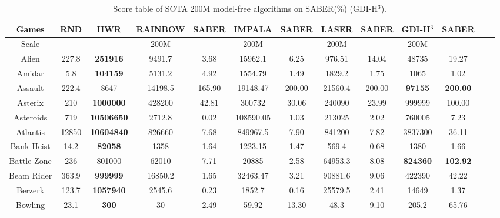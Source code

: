 \documentclass[nohyperref]{article}
\theoremstyle{plain}
\begin{document}
\begin{table}[!hb]
\footnotesize
\begin{center}
\caption{Score table of SOTA 200M model-free algorithms on SABER(\%)  (GDI-H$^3$).}
\setlength{\tabcolsep}{1.0pt}
\begin{tabular}{ |c |c |c| c c| c c|  c c |c c |c c |}
\hline
Games & RND & HWR & RAINBOW & SABER & IMPALA & SABER & LASER & SABER  & GDI-H$^3$ & SABER\\
\hline
Scale  &     &       & 200M   &       &  200M    &        & 200M   & &  200M   & \\
\hline
 Alien              & 227.8     & \textbf{251916}    & 9491.7   &3.68    & 15962.1    & 6.25       & 976.51  & 14.04       &48735             &19.27  \\
 Amidar             & 5.8       & \textbf{104159}    & 5131.2   &4.92    & 1554.79    & 1.49       & 1829.2  & 1.75        &1065              &1.02           \\
 Assault            & 222.4     & 8647               & 14198.5  &165.90  & 19148.47   & 200.00     & 21560.4 & 200.00    &\textbf{97155}     &\textbf{200.00} \\
 Asterix            & 210       & \textbf{1000000}   & 428200   &42.81   & 300732     & 30.06      & 240090  & 23.99     &999999            &100.00\\
 Asteroids          & 719       & \textbf{10506650}  & 2712.8   &0.02    & 108590.05  & 1.03       & 213025  & 2.02         &760005            &7.23\\
 Atlantis           & 12850     & \textbf{10604840}  & 826660   &7.68    & 849967.5   & 7.90       & 841200  & 7.82       &3837300           &36.11\\
 Bank Heist         & 14.2      & \textbf{82058}     & 1358     &1.64    & 1223.15    & 1.47       & 569.4   & 0.68        &1380              &1.66 \\
 Battle Zone        & 236       &801000    & 62010    &7.71    & 20885      & 2.58       & 64953.3 & 8.08        &\textbf{824360}            &\textbf{102.92} \\
 Beam Rider         & 363.9     & \textbf{999999}    & 16850.2  &1.65    & 32463.47   & 3.21       & 90881.6 & 9.06       &422390            &42.22 \\
 Berzerk            & 123.7     & \textbf{1057940}            & 2545.6   &0.23    & 1852.7     & 0.16       & 25579.5 & 2.41      &14649             &1.37             \\
 Bowling            & 23.1      & \textbf{300}       & 30       &2.49    & 59.92      & 13.30      & 48.3    & 9.10         &205.2             &65.76\\

\end{tabular}
\end{center}
\end{table}
\end{document}
